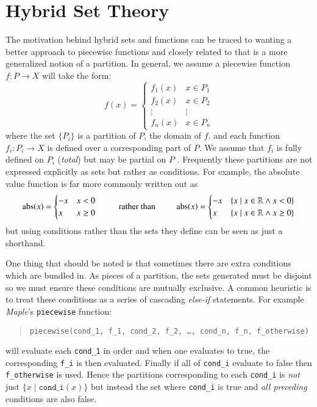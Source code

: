 \chapter{Hybrid Set Theory}

%
%

The motivation behind hybrid sets and functions can be traced to wanting a better approach to piecewise functions
and closely related to that is a more generalized notion of a partition.
In general, we assume a piecewise function $f : P \to X$ will take the form:
\begin{equation}
	\label{eq_fP}
	f(x) = 
	     \begin{cases}
	       f_1(x) & x \in P_1 \\
	       f_2(x) & x \in P_2 \\ 
	       \vdots & \vdots \\
	       f_n(x) & x \in P_n
	     \end{cases}
\end{equation}
where the set $\{ P _ i \}$ is a partition of $P$, the domain of $f$.
and each function $f_i: P_i \to X$ is defined over a corresponding part of $P$. 
We assume that $f_i$ is fully defined on $P_i$ (\emph{total}) but may be partial on $P$ .
Frequently these partitions are not expressed explicitly as sets but rather as conditions.
For example, the absolute value function is far more commonly written out as
\begin{equation*}
	\text{abs}(x) = \begin{cases} -x & x < 0 \\ x & x \geq 0 \end{cases}
	\;\;\;\;\;\;\;\;\;\text{rather than}\;\;\;\;\;\;\;\;\;
	\text{abs}(x) = 
	\begin{cases}
		-x & \{x \;|\; x \in \mathbb{R} \wedge x < 0\}  \\ 
		x & \{x \;|\; x \in \mathbb{R} \wedge x \geq 0 \}
	\end{cases}
\end{equation*}
but using conditions rather than the sets they define can be seen as just a shorthand. 


One thing that should be noted is that sometimes there are extra conditions which are bundled in.
As pieces of a partition, the sets generated must be disjoint so we must ensure these conditions are mutually exclusive.
A common heuristic is to treat these conditions as a series of cascading \emph{else-if} statements.
For example \emph{Maple}'s \texttt{piecewise} function:
\begin{quote}
	\texttt{piecewise(cond\_1, f\_1, cond\_2, f\_2, \ldots, cond\_n, f\_n, f\_otherwise)} 
\end{quote}	
will evaluate each \texttt{cond\_1} in order and when one evaluates to true, the corresponding \texttt{f\_i} is then evaluated.
Finally if all of \texttt{cond\_i} evaluate to false then \texttt{f\_otherwise} is used.
Hence the partitions corresponding to each \texttt{cond\_i} is \emph{not} just $\{ x \;|\; \texttt{cond\_i}(x) \}$
but instead the set where \texttt{cond\_i} is true and \emph{all preceding} conditions are also false.


